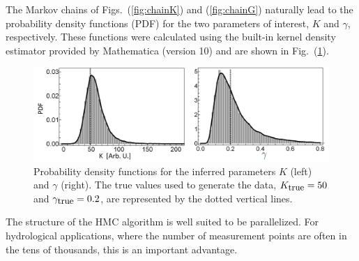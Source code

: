 \documentclass[12pt,a4paper,final]{iopart}
\begin{document}
%
The Markov chains of Figs.~(\ref{fig:chainK}) and (\ref{fig:chainG}) naturally lead to the probability density functions (PDF) for the two parameters of interest, $K$ and $\gamma$, respectively. These functions were calculated using the built-in kernel density estimator provided by Mathematica (version 10) and are shown in Fig.~(\ref{fig:KG_distr}).
\begin{figure}[htb!]
    \centering
    \includegraphics[width=1.0\textwidth]{Figs/FigKg.png}
    \caption{Probability density functions for the inferred parameters $K$ (left) and $\gamma$ (right). The true values used to generate the data, $K_{\mbox{\small true}}=50$ and $\gamma_{\mbox{\small true}}=0.2$, are represented by the dotted vertical lines.}
    \label{fig:KG_distr}
\end{figure}

The structure of the HMC algorithm is well suited to be parallelized.
For hydrological applications, where the number of measurement points are often in the tens of thousands, this is an important advantage.
\end{document}
